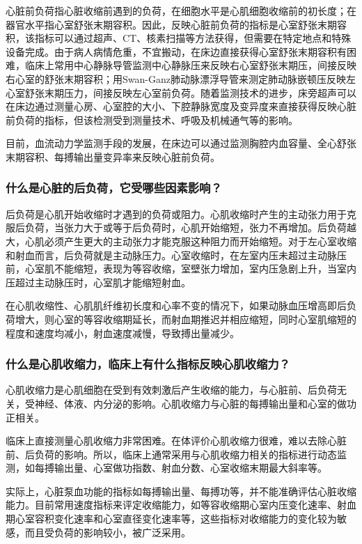 心脏前负荷指心脏收缩前遇到的负荷，在细胞水平是心肌细胞收缩前的初长度；在器官水平指心室舒张末期容积。因此，反映心脏前负荷的指标是心室舒张末期容积，该指标可以通过超声、CT、核素扫描等方法获得，但需要在特定地点和特殊设备完成。由于病人病情危重，不宜搬动，在床边直接获得心室舒张末期容积有困难，临床上常用中心静脉导管监测中心静脉压来反映右心室舒张末期压，间接反映右心室的舒张末期容积；用Swan-Ganz肺动脉漂浮导管来测定肺动脉嵌顿压反映左心室舒张末期压力，间接反映左心室前负荷。随着监测技术的进步，床旁超声可以在床边通过测量心房、心室腔的大小、下腔静脉宽度及变异度来直接获得反映心脏前负荷的指标，但该检测受到测量技术、呼吸及机械通气等的影响。

目前，血流动力学监测手段的发展，在床边可以通过监测胸腔内血容量、全心舒张末期容积、每搏输出量变异率来反映心脏前负荷。

\subsubsection{什么是心脏的后负荷，它受哪些因素影响？}

后负荷是心肌开始收缩时才遇到的负荷或阻力。心肌收缩时产生的主动张力用于克服后负荷，当张力大于或等于后负荷时，心肌开始缩短，张力不再增加。后负荷越大，心肌必须产生更大的主动张力才能克服这种阻力而开始缩短。对于左心室收缩和射血而言，后负荷就是主动脉压力。心室收缩时，在左室内压未超过主动脉压前，心室肌不能缩短，表现为等容收缩，室壁张力增加，室内压急剧上升，当室内压超过主动脉压时，心室肌才能缩短射血。

在心肌收缩性、心肌肌纤维初长度和心率不变的情况下，如果动脉血压增高即后负荷增大，则心室的等容收缩期延长，而射血期推迟并相应缩短，同时心室肌缩短的程度和速度均减小，射血速度减慢，导致搏出量减少。

\subsubsection{什么是心肌收缩力，临床上有什么指标反映心肌收缩力？}

心肌收缩力是心肌细胞在受到有效刺激后产生收缩的能力，与心脏前、后负荷无关，受神经、体液、内分泌的影响。心肌收缩力与心脏的每搏输出量和心室的做功正相关。

临床上直接测量心肌收缩力非常困难。在体评价心肌收缩力很难，难以去除心脏前、后负荷的影响。所以，临床上通常采用与心肌收缩力相关的指标进行动态监测，如每搏输出量、心室做功指数、射血分数、心室收缩末期最大斜率等。

实际上，心脏泵血功能的指标如每搏输出量、每搏功等，并不能准确评估心脏收缩能力。目前常用速度指标来评定收缩能力，如等容收缩期心室内压变化速率、射血期心室容积变化速率和心室直径变化速率等，这些指标对收缩能力的变化较为敏感，而且受负荷的影响较小，被广泛采用。

